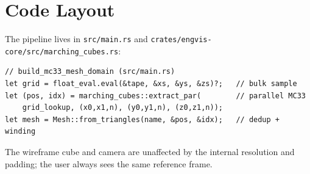 \documentclass[11pt]{article}
\begin{document}
\section{Code Layout}

The pipeline lives in \texttt{src/main.rs} and
\texttt{crates/engvis-core/src/marching\_cubes.rs}:
\begin{lstlisting}
// build_mc33_mesh_domain (src/main.rs)
let grid = float_eval.eval(&tape, &xs, &ys, &zs)?;   // bulk sample
let (pos, idx) = marching_cubes::extract_par(        // parallel MC33
    grid_lookup, (x0,x1,n), (y0,y1,n), (z0,z1,n));
let mesh = Mesh::from_triangles(name, &pos, &idx);   // dedup + winding
\end{lstlisting}

The wireframe cube and camera are unaffected by the internal
resolution and padding; the user always sees the same reference
frame.
\end{document}
